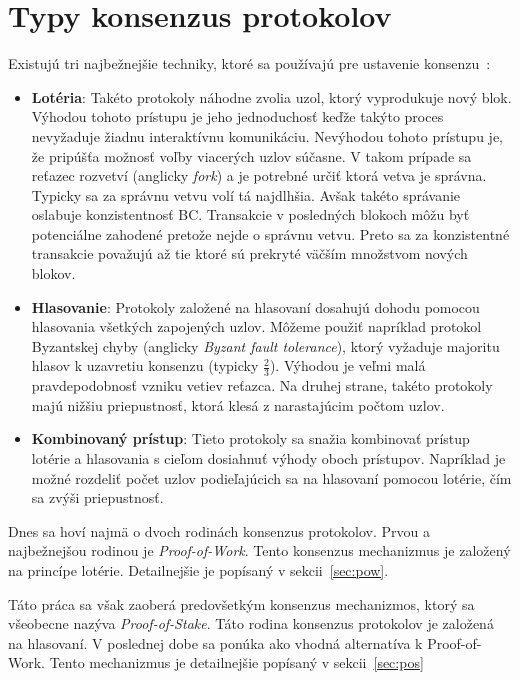 \section{Typy konsenzus protokolov}
Existujú tri najbežnejšie techniky, ktoré sa používajú pre ustavenie konsenzu~\cite{zhangConsensus, homoliakBlockchain}:
\begin{itemize}
	\item \textbf{Lotéria}: Takéto protokoly náhodne zvolia uzol, ktorý vyprodukuje nový blok. Výhodou tohoto prístupu je jeho jednoduchosť keďže takýto proces nevyžaduje žiadnu interaktívnu komunikáciu. Nevýhodou tohoto prístupu je, že pripúšťa možnosť voľby viacerých uzlov súčasne. V takom prípade sa reťazec rozvetví (anglicky \textit{fork}) a je potrebné určiť ktorá vetva je správna. Typicky sa za správnu vetvu volí tá najdlhšia. Avšak takéto správanie oslabuje konzistentnosť BC. Transakcie v posledných blokoch môžu byť potenciálne zahodené pretože nejde o správnu vetvu. Preto sa za konzistentné transakcie považujú až tie ktoré sú prekryté väčším množstvom nových blokov.
	\item \textbf{Hlasovanie}: Protokoly založené na hlasovaní dosahujú dohodu pomocou hlasovania všetkých zapojených uzlov. Môžeme použiť napríklad protokol Byzantskej chyby (anglicky \textit{Byzant fault tolerance}), ktorý vyžaduje majoritu hlasov k uzavretiu konsenzu (typicky $\frac{2}{3}$). Výhodou je veľmi malá pravdepodobnosť vzniku vetiev reťazca. Na druhej strane, takéto protokoly majú nižšiu priepustnosť, ktorá klesá z narastajúcim počtom uzlov.
	\item \textbf{Kombinovaný prístup}: Tieto protokoly sa snažia kombinovať prístup lotérie a hlasovania s cieľom dosiahnuť výhody oboch prístupov. Napríklad je možné rozdeliť počet uzlov podieľajúcich sa na hlasovaní pomocou lotérie, čím sa zvýši priepustnosť.
\end{itemize}

Dnes sa hoví najmä o dvoch rodinách konsenzus protokolov. Prvou a najbežnejšou rodinou je \textit{Proof-of-Work}. Tento konsenzus mechanizmus je založený na princípe lotérie. Detailnejšie je popísaný v sekcii~\ref{sec:pow}.

Táto práca sa však zaoberá predovšetkým konsenzus mechanizmos, ktorý sa všeobecne nazýva \textit{Proof-of-Stake}. Táto rodina konsenzus protokolov je založená na hlasovaní. V poslednej dobe sa ponúka ako vhodná alternatíva k Proof-of-Work. Tento mechanizmus je detailnejšie popísaný v sekcii~\ref{sec:pos}

